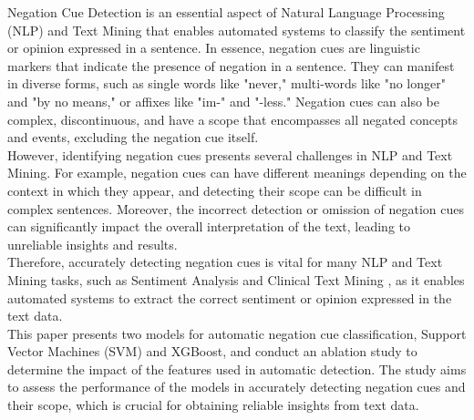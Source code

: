 Negation Cue Detection is an essential aspect of Natural Language Processing (NLP) and Text Mining that enables automated systems to classify the sentiment or opinion expressed in a sentence. In essence, negation cues are linguistic markers that indicate the presence of negation in a sentence. They can manifest in diverse forms, such as single words like "never," multi-words like "no longer" and "by no means," or affixes like "im-" and "-less." Negation cues can also be complex, discontinuous, and have a scope that encompasses all negated concepts and events, excluding the negation cue itself. \cite{jbara-2012}
\\

However, identifying negation cues presents several challenges in NLP and Text Mining. For example, negation cues can have different meanings depending on the context in which they appear, and detecting their scope can be difficult in complex sentences. Moreover, the incorrect detection or omission of negation cues can significantly impact the overall interpretation of the text, leading to unreliable insights and results.
\\

Therefore, accurately detecting negation cues is vital for many NLP and Text Mining tasks, such as Sentiment Analysis \cite{cruz2016machine} and Clinical Text Mining \cite{mehrabi2015deepen}, as it enables automated systems to extract the correct sentiment or opinion expressed in the text data. 
\\

This paper presents two models for automatic negation cue classification,  Support Vector Machines (SVM) and XGBoost, and conduct an ablation study to determine the impact of the features used in automatic detection. The study aims to assess the performance of the models in accurately detecting negation cues and their scope, which is crucial for obtaining reliable insights from text data.

